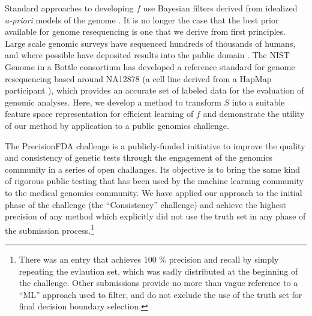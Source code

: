 \documentclass{article}
\begin{document}

Standard approaches to developing $f$ use Bayesian filters derived from idealized \emph{a-priori} models of the genome  \cite{samtools, gatk2011, garrison2012haplotype, rimmer2014integrating, li2011stats}.
It is no longer the case that the best prior available for genome resequencing is one that we derive from first principles. 
Large scale genomic surveys have sequenced hundreds of thousands of humans, and where possible have deposited results into the public domain \cite{1000Gphase1, 1000g2015, exac2015, cavalli2005human, uk10k2015uk10k}.
The NIST Genome in a Bottle consortium \cite{zook2014integrating} has developed a reference standard for genome resequencing based around NA12878 (a cell line derived from a HapMap participant \cite{gibbs2003international}), which provides an accurate set of labeled data for the evaluation of genomic analyses.
Here, we develop a method to transform $S$ into a suitable feature space representation for efficient learning of $f$ and demonstrate the utility of our method by application to a public genomics challenge.



The PrecisionFDA challenge is a publicly-funded initiative to improve the quality and consistency of genetic tests through the engagement of the genomics community in a series of open challanges.
Its objective is to bring the same kind of rigorous public testing that has been used by the machine learning community to the medical genomics community.
We have applied our approach to the initial phase of the challenge (the ``Consistency'' challenge) and achieve the highest precision of any method which explicitly did not use the truth set in any phase of the submission process.\footnote{There was an entry that achieves 100 \% precision and recall by simply repeating the evlaution set, which was sadly distributed at the beginning of the challenge. Other submissions provide no more than vague reference to a ``ML'' approach used to filter, and do not exclude the use of the truth set for final decision boundary selection.}
\end{document}
